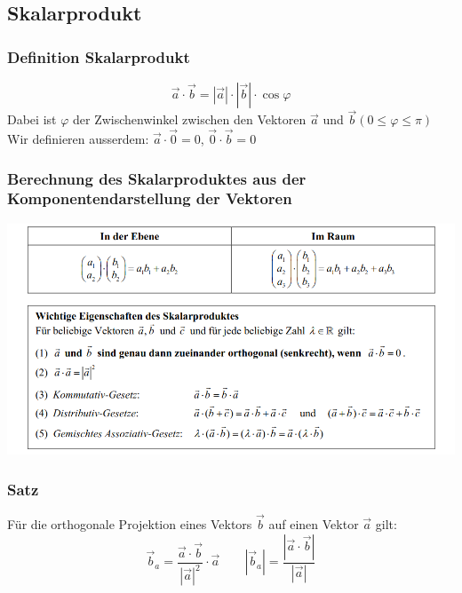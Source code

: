 \subsection{Skalarprodukt}
\subsubsection{Definition Skalarprodukt}%
\label{ssub:Definition Skalarprodukt}
\begin{equation*}
  \vec{a} \cdot \vec{b} = |\vec{a}| \cdot |\vec{b}| \cdot \cos{\varphi}
\end{equation*}
Dabei ist $\varphi$ der Zwischenwinkel zwischen den Vektoren $\vec{a}$ und $\vec{b} (0 \leq \varphi \leq \pi)$
Wir definieren ausserdem: $\vec{a} \cdot \vec{0} = 0$, $\vec{0} \cdot \vec{b} = 0$

\subsubsection{Berechnung des Skalarproduktes aus der Komponentendarstellung der Vektoren}%
\label{ssub:Berechnung des Skalarproduktes aus der Komponentendarstellung der Vektoren}
\begin{center}
  \includegraphics[width=1\linewidth]{images/skalarpr.png}
\end{center}

\subsubsection{Satz}%
\label{ssub:Satz}
Für die orthogonale Projektion eines Vektors $\vec{b}$ auf einen Vektor $\vec{a}$ gilt:
\begin{equation*}
  \vec{b}_a = \frac{\vec{a} \cdot \vec{b}}{|\vec{a}|^2} \cdot \vec{a} \qquad |\vec{b}_a| = \frac{|\vec{a} \cdot \vec{b}|}{|\vec{a}|}
\end{equation*}

